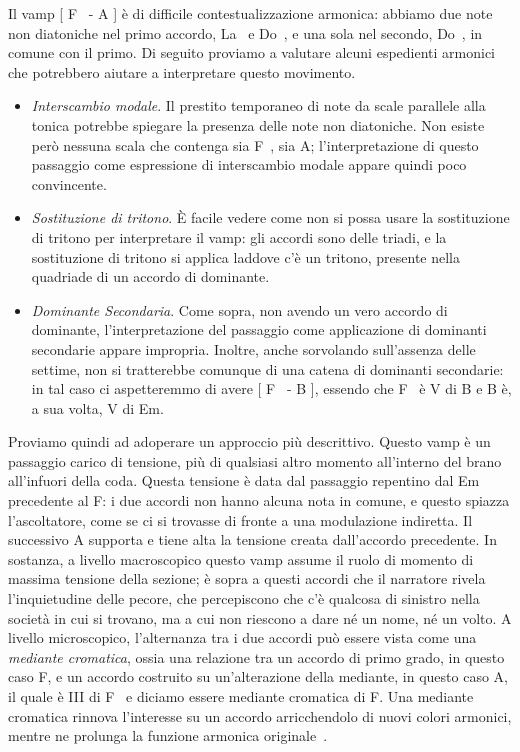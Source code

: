 \documentclass[class=book, crop=false, oneside, 12pt]{standalone}
\begin{document}
    Il vamp [ F\sharp~ - A ] è  di difficile contestualizzazione armonica: abbiamo due note non diatoniche nel primo accordo, La\sharp~ e Do\sharp~, e una sola nel secondo, Do\sharp~, in comune con il primo. Di seguito proviamo a valutare alcuni espedienti armonici che potrebbero aiutare a interpretare questo movimento.
    \begin{itemize}
        \item \emph{Interscambio modale}. Il prestito temporaneo di note da scale parallele alla tonica potrebbe spiegare la presenza delle note non diatoniche. Non esiste però nessuna scala che contenga sia F\sharp~, sia A; l'interpretazione di questo passaggio come espressione di interscambio modale appare quindi poco convincente.
        \item \emph{Sostituzione di tritono}. È facile vedere come non si possa usare la sostituzione di tritono per interpretare il vamp: gli accordi sono delle triadi, e la sostituzione di tritono si applica laddove c'è un tritono, presente nella quadriade di un accordo di dominante.
        \item \emph{Dominante Secondaria}. Come sopra, non avendo un vero accordo di dominante, l'interpretazione del passaggio come applicazione di dominanti secondarie appare impropria. Inoltre, anche sorvolando sull'assenza delle settime, non si tratterebbe comunque di una catena di dominanti secondarie: in tal caso ci aspetteremmo di avere [ F\sharp~ - B ], essendo che F\sharp~ è V di B e B è, a sua volta, V di Em.
    \end{itemize}
    
    Proviamo quindi ad adoperare un approccio più descrittivo. Questo vamp è un passaggio carico di tensione, più di qualsiasi altro momento all'interno del brano all'infuori della coda. Questa tensione è data dal passaggio repentino dal Em precedente al F\sharp : i due accordi non hanno alcuna nota in comune, e questo spiazza l'ascoltatore, come se ci si trovasse di fronte a una modulazione indiretta. Il successivo A supporta e tiene alta la tensione creata dall'accordo precedente. In sostanza, a livello macroscopico questo vamp assume il ruolo di momento di massima tensione della sezione; è sopra a questi accordi che il narratore rivela l'inquietudine delle pecore, che percepiscono che c'è qualcosa di sinistro nella società in cui si trovano, ma a cui non riescono a dare né un nome, né un volto. A livello microscopico, l'alternanza tra i due accordi può essere vista come una \emph{mediante cromatica}, ossia una relazione tra un accordo di primo grado, in questo caso F\sharp, e un accordo costruito su un'alterazione della mediante,  in questo caso A, il quale è \flat III di F\sharp~ e diciamo essere mediante cromatica di F\sharp. Una mediante cromatica rinnova l'interesse su un accordo arricchendolo di nuovi colori armonici, mentre ne prolunga la funzione armonica originale~\cite[12.2, p. 202]{benward2014music}.
\end{document}
